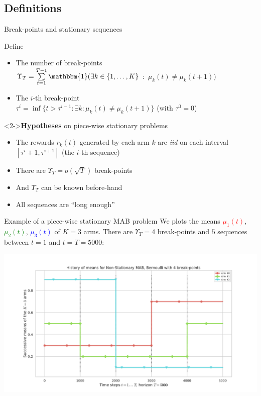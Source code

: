 \documentclass[11pt,english,ignorenonframetext,]{beamer}
\providecommand{\tightlist}{%
  \setlength{\itemsep}{0pt}\setlength{\parskip}{0pt}}
\begin{document}
\subsection{\hfill{}Definitions\hfill{}}

\begin{frame}{Break-points and stationary sequences}

  Define

  \begin{itemize}
    \item
    The number of break-points\\
    $\Upsilon_T = \sum\limits_{t=1}^{T-1} \mathbbm{1}(\exists k\in \{1,\dots,K\}$ $:$ $\mu_k(t) \neq \mu_k(t+1) )$

    \item
    The $i$-th break-point\\
    $\tau^{i} = \inf\{t > \tau^{i-1} : \exists k : \mu_k(t) \neq \mu_k(t+1)\}$
    \hfill{} (with $\tau^0=0$)
  \end{itemize}

  \begin{block}<2->{\textbf{Hypotheses} on piece-wise stationary problems}
    \begin{itemize}\tightlist
      \item The rewards $r_k(t)$ generated by each arm $k$ are \alert{\emph{iid} on each interval} $[ \tau^{i} + 1, \tau^{i+1} ]$ (the $i$-th sequence)
      \item There are $\Upsilon_T = o(\sqrt{T})$ break-points
      \item And \alert{$\Upsilon_T$ can be known before-hand}
      \item All sequences are ``long enough''
  \end{itemize}
\end{block}
\end{frame}


\begin{frame}[plain]{Example of a piece-wise stationary MAB problem}
  We plots the means \textcolor{red}{$\mu_1(t)$}, \textcolor{green}{$\mu_2(t)$}, \textcolor{blue}{$\mu_3(t)$}
  of $K=3$ arms.
  There are $\Upsilon_T=4$ break-points and $5$ sequences
  between $t=1$ and $t=T=5000$:
  \begin{center}
    \includegraphics[width=1.00\textwidth]{figures/Problem_1.pdf}
  \end{center}
\end{frame}
\end{document}
